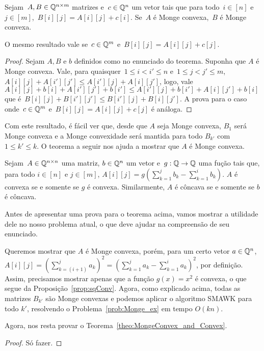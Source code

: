 \begin{lema}
Sejam~$A,B \in \mathbb{Q}^{n \times m}$ matrizes e~$c \in \mathbb{Q}^n$ um vetor tais que para todo~$i \in [n]$ e~$j \in [m]$,~${B[i][j] = A[i][j] + c[i]}$. Se~$A$ é Monge convexa,~$B$ é Monge convexa.  

O mesmo resultado vale se~$c \in \mathbb{Q}^m$ e~${B[i][j] = A[i][j] + c[j]}$.
\end{lema}

\begin{proof}
Sejam $A,B$ e $b$ definidos como no enunciado do teorema. Suponha que $A$ é Monge convexa. Vale, para quaisquer~${1 \leq i < i' \leq n}$ e~${1 \leq j < j' \leq m}$,~${A[i][j] + A[i'][j'] \leq A[i'][j] + A[i][j']}$, logo, vale~${A[i][j] + b[i] + A[i'][j'] + b[i'] \leq A[i'][j] + b[i'] + A[i][j'] + b[i]}$ que é~${B[i][j] + B[i'][j'] \leq B[i'][j] + B[i][j']}$. A prova para o caso onde~$c \in \mathbb{Q}^m$ e~${B[i][j] = A[i][j] + c[j]}$ é análoga.
\end{proof}

Com este resultado, é fácil ver que, desde que $A$ seja Monge convexa, $B_1$ será Monge convexa e a Monge convexidade será mantida para todo $B_{k'}$ com $1 \leq k' \leq k$. O teorema a seguir nos ajuda a mostrar que $A$ é Monge convexa.

\begin{theo} \label{theo:MongeConvex_and_Convex}
Sejam~$A \in \mathbb{Q}^{n \times n}$ uma matriz, $b \in \mathbb{Q}^n$ um vetor e~${g : \mathbb{Q} \to \mathbb{Q}}$ uma fução tais que, para todo $i \in [n]$ e $j \in [m]$, $A[i][j] = g\left(\sum\limits_{k=1}^j b_k - \sum\limits_{k=1}^i b_k\right)$. $A$ é convexa se e somente se $g$ é convexa. Similarmente, $A$ é côncava se e somente se $b$ é côncava.
\end{theo}

Antes de apresentar uma prova para o teorema acima, vamos mostrar a utilidade dele no nosso problema atual, o que deve ajudar na compreensão de seu enunciado.  

Queremos mostrar que $A$ é Monge convexa, porém, para um certo vetor $a \in \mathbb{Q}^n$, $A[i][j] = \left(\sum\limits_{k=(i+1)}^{j} a_k \right)^2 = \left(\sum\limits_{k=1}^{j} a_k - \sum\limits_{k=1}^{i} a_k \right)^2$, por definição. Assim, precisamos mostrar apenas que a função $g(x) = x^2$ é convexa, o que segue da Proposição~\ref{prop:sqConv}. Agora, como explicado acima, todas as matrizes $B_{k'}$ são Monge convexas e podemos aplicar o algoritmo SMAWK para todo $k'$, resolvendo o Problema~\ref{prob:Monge_ex} em tempo $O(kn)$.

Agora, nos resta provar o Teorema~\ref{theo:MongeConvex_and_Convex}.

\begin{proof}
Só fazer.
\end{proof}
